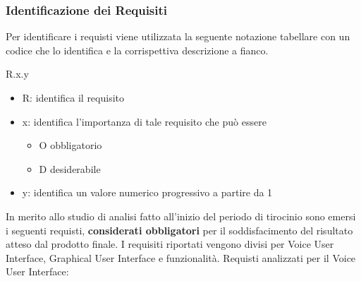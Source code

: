 \subsubsection{Identificazione dei Requisiti}
Per identificare i requisti viene utilizzata la seguente notazione tabellare con un codice che lo identifica e la corrispettiva descrizione a fianco.
\begin{center}
    R.x.y
\end{center}
\begin{itemize}
    \item R: identifica il requisito
    \item x: identifica l'importanza di tale requisito che può essere
        \begin{itemize}
            \item O obbligatorio
            \item D desiderabile
        \end{itemize}
    \item y: identifica un valore numerico progressivo a partire da 1
\end{itemize}
In merito allo studio di analisi fatto all'inizio del periodo di tirocinio sono emersi i seguenti requisti, \textbf{considerati obbligatori} per il soddisfacimento del risultato atteso dal prodotto finale. I requisiti riportati vengono divisi per Voice User Interface, Graphical User Interface e funzionalità.
\newpage
\noindent Requisti analizzati per il Voice User Interface:
